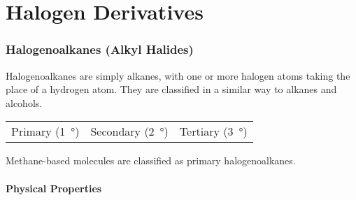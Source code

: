

\pagebreak
\hypertarget{ChapterHalogenDerivatives}{}
\part{Halogen Derivatives}

	\section{Halogenoalkanes (Alkyl Halides)}

		Halogenoalkanes are simply alkanes, with one or more halogen atoms taking the place of a hydrogen atom. They are classified in a
		similar way to alkanes and alcohols.

		\begin{center}\begin{table}[ht]\renewcommand{\arraystretch}{1.4}
		\begin{tabu} to \textwidth {| X[c,m] | X[c,m] | X[c,m] |}

			\hline
			\vspace{2mm}					\vspace{2mm}	&
			\vspace{2mm}				\vspace{2mm}	&
			\vspace{2mm}		\vspace{2mm}	\\

			\hline
			Primary (\SI{1}{\degree})		&
			Secondary (\SI{2}{\degree})		&
			Tertiary (\SI{3}{\degree})		\\
			\hline

		\end{tabu}
		\end{table}\end{center}\vspace{-10mm}

		Methane-based molecules are classified as primary halogenoalkanes.

		\subsection{Physical Properties}

